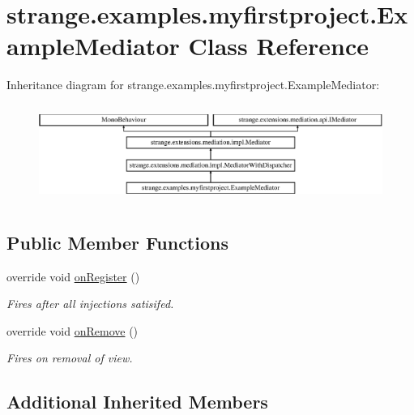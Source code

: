 \hypertarget{classstrange_1_1examples_1_1myfirstproject_1_1_example_mediator}{\section{strange.\-examples.\-myfirstproject.\-Example\-Mediator Class Reference}
\label{classstrange_1_1examples_1_1myfirstproject_1_1_example_mediator}
}
Inheritance diagram for strange.\-examples.\-myfirstproject.\-Example\-Mediator\-:\begin{figure}[H]
\begin{center}
\leavevmode
\includegraphics[height=3.227666cm]{classstrange_1_1examples_1_1myfirstproject_1_1_example_mediator}
\end{center}
\end{figure}
\subsection*{Public Member Functions}
\begin{DoxyCompactItemize}
\item 
override void \hyperlink{classstrange_1_1examples_1_1myfirstproject_1_1_example_mediator_a4e8c1dd63a3fcf7b6ec32fcedb1f4591}{on\-Register} ()
\begin{DoxyCompactList}\small\item\em Fires after all injections satisifed. \end{DoxyCompactList}\item 
override void \hyperlink{classstrange_1_1examples_1_1myfirstproject_1_1_example_mediator_ae96bbdecc9796c6fc45fa75eb8cc88b7}{on\-Remove} ()
\begin{DoxyCompactList}\small\item\em Fires on removal of view. \end{DoxyCompactList}\end{DoxyCompactItemize}
\subsection*{Additional Inherited Members}


